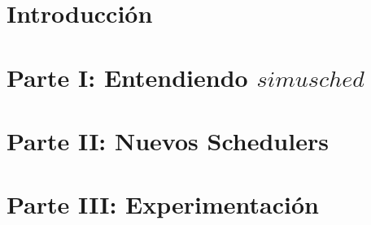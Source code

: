 \documentclass[11pt, a4paper]{article}
\begin{document}

\maketitle
\newpage
\tableofcontents
\newpage


\section{Introducción}

\section{Parte I: Entendiendo $simusched$}

\section{Parte II: Nuevos Schedulers}

\section{Parte III: Experimentación}
	


\end{document}
